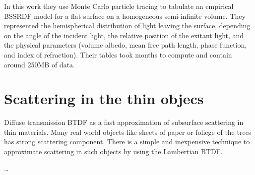 In this work they use Monte Carlo particle tracing to tabulate an empirical
BSSRDF model for a flat surface on a homogeneous semi-infinite volume.
They represented the hemispherical distribution of light leaving the surface,
depending on the angle of the incident light, the relative position of the
exitant light, and the physical parameters (volume albedo, mean free path
length, phase function, and index of refraction). Their tables took months to
compute and contain around 250MB of data.

\section{Scattering in the thin objecs}
Diffuse transmission BTDF as a fast approximation of subsurface scattering in
thin materials.
Many real world objects like sheets of paper or foliege of the trees has strong
scattering component. There is a simple and inexpensive technique to approximate
scattering in such objects by using the Lambertian BTDF.

\ldots
